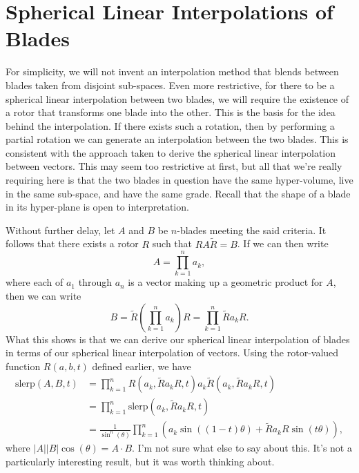 \documentclass{article}
\begin{document}
\section*{Spherical Linear Interpolations of Blades}

For simplicity, we will not invent an interpolation method that
blends between blades taken from disjoint sub-spaces.
Even more restrictive, for there to be a spherical linear
interpolation between two blades, we will require the existence
of a rotor that transforms one blade into the other.  This is
the basis for the idea behind the interpolation.  If there exists
such a rotation, then by performing a partial rotation we can
generate an interpolation between the two blades.  This is consistent
with the approach taken to derive the spherical linear interpolation
between vectors.  This may seem too restrictive at first, but all that
we're really requiring here is that the two blades in question have
the same hyper-volume, live in the same sub-space, and have the same grade.
Recall that the shape of a blade in its hyper-plane is open to interpretation.

Without further delay, let $A$ and $B$ be $n$-blades meeting the said criteria.
It follows that there exists a rotor $R$ such that $RA\tilde{R}=B$.
If we can then write
\begin{equation*}
A = \prod_{k=1}^n a_k,
\end{equation*}
where each of $a_1$ through $a_n$ is a vector making up a geometric product for $A$,
then we can write
\begin{equation*}
B = \tilde{R}\left(\prod_{k=1}^n a_k\right)R = \prod_{k=1}^n \tilde{R}a_k R.
\end{equation*}
What this shows is that we can derive our spherical linear interpolation of blades
in terms of our spherical linear interpolation of vectors.
Using the rotor-valued function $R(a,b,t)$ defined earlier, we have
\begin{align*}
\mbox{slerp}(A,B,t) &= \prod_{k=1}^n R(a_k,\tilde{R}a_kR,t)a_k\tilde{R}(a_k,\tilde{R}a_kR,t) \\
 &= \prod_{k=1}^n\mbox{slerp}(a_k,\tilde{R}a_kR,t) \\
 &= \frac{1}{\sin^n(\theta)}\prod_{k=1}^n(a_k\sin((1-t)\theta)+\tilde{R}a_kR\sin(t\theta)),
\end{align*}
where $|A||B|\cos(\theta)=A\cdot B$.  I'm not sure what else to say about this.
It's not a particularly interesting result, but it was worth thinking about.

\end{document}
